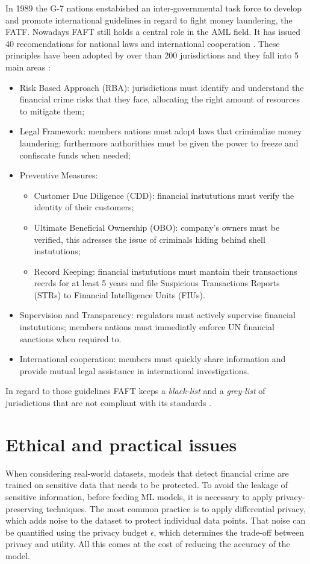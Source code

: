 In 1989 the G-7 nations enstabished an inter-governmental task force to develop and promote international guidelines in regard to fight money laundering, the FATF. Nowadays FAFT still holds a central role in the AML field. It has issued 40 recomendations for national laws and international cooperation \cite{regulations}.
These principles have been adopted by over than 200 jurisdictions and they fall into 5 main areas \cite{ruleBased}:
\begin{itemize}
    \item Risk Based Approach (RBA): jurisdictions must identify and understand the financial crime risks that they face, allocating the right amount of resources to mitigate them;
    \item Legal Framework: members nations must adopt laws that criminalize money laundering; furthermore authorithies must be given the power to freeze and confiscate funds when needed;
    \item Preventive Measures:
    \begin{itemize}
        \item Customer Due Diligence (CDD): financial instututions must verify the identity of their customers;
        \item Ultimate Beneficial Ownership (OBO): company's owners must be verified, this adresses the issue of criminals hiding behind shell instututions;
        \item Record Keeping: financial instututions must mantain their transactions recrds for at least 5 years and file Suspicious Transactions Reports (STRs) to Financial Intelligence Units (FIUs).
    \end{itemize} 
    \item Supervision and Transparency: regulators must actively supervise financial instututions; members nations must immediatly enforce UN financial sanctions when required to.
    \item International cooperation: members must quickly share information and provide mutual legal assistance in international investigations.
\end{itemize}
In regard to those guidelines FAFT keeps a \textit{black-list} and a \textit{grey-list} of jurisdictions that are not compliant with its standards \cite{regulations}.

\section{Ethical and practical issues} \label{patterns}
When considering real-world datasets, models that detect financial crime are trained on sensitive data that needs to be protected. To avoid the leakage of sensitive information, before feeding ML models, it is necessary to apply privacy-preserving techniques. The most common practice is to apply differential privacy, which adds noise to the dataset to protect individual data points. That noise can be quantified using the privacy budget $\epsilon$, which determines the trade-off between privacy and utility. All this comes at the cost of reducing the accuracy of the model.

